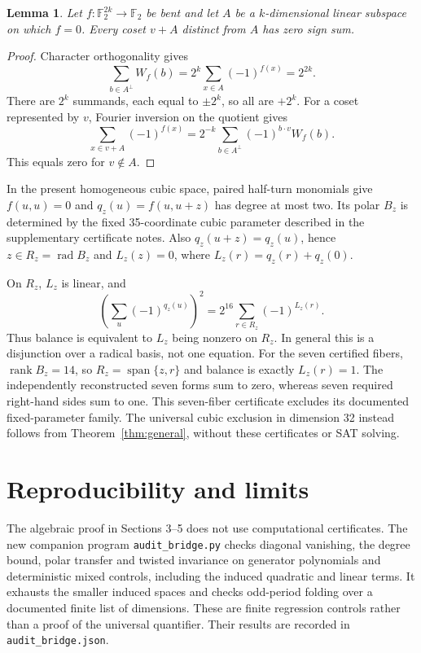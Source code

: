 \documentclass[11pt,a4paper]{article}
\newtheorem{lemma}[theorem]{Lemma}
\newcommand{\F}{\mathbb F_2}
\begin{document}
\begin{lemma}\label{lem:fiber}
Let $f:\F^{2k}\to\F$ be bent and let $A$ be a $k$-dimensional linear subspace on which $f=0$. Every coset $v+A$ distinct from $A$ has zero sign sum.
\end{lemma}
\begin{proof}
Character orthogonality gives
\[
 \sum_{b\in A^\perp}W_f(b)
 =2^k\sum_{x\in A}(-1)^{f(x)}=2^{2k}.
\]
There are $2^k$ summands, each equal to $\pm2^k$, so all are $+2^k$. For a coset represented by $v$, Fourier inversion on the quotient gives
\[
 \sum_{x\in v+A}(-1)^{f(x)}
 =2^{-k}\sum_{b\in A^\perp}(-1)^{b\cdot v}W_f(b).
\]
This equals zero for $v\notin A$.
\end{proof}
In the present homogeneous cubic space, paired half-turn monomials give $f(u,u)=0$ and $q_z(u)=f(u,u+z)$ has degree at most two. Its polar $B_z$ is determined by the fixed 35-coordinate cubic parameter described in the supplementary certificate notes. Also $q_z(u+z)=q_z(u)$, hence $z\in R_z=\operatorname{rad}B_z$ and $L_z(z)=0$, where $L_z(r)=q_z(r)+q_z(0)$.

On $R_z$, $L_z$ is linear, and
\[
 \left(\sum_u(-1)^{q_z(u)}\right)^2
 =2^{16}\sum_{r\in R_z}(-1)^{L_z(r)}.
\]
Thus balance is equivalent to $L_z$ being nonzero on $R_z$. In general this is a disjunction over a radical basis, not one equation. For the seven certified fibers, $\operatorname{rank}B_z=14$, so $R_z=\operatorname{span}\{z,r\}$ and balance is exactly $L_z(r)=1$. The independently reconstructed seven forms sum to zero, whereas seven required right-hand sides sum to one. This seven-fiber certificate excludes its documented fixed-parameter family. The universal cubic exclusion in dimension 32 instead follows from Theorem~\ref{thm:general}, without these certificates or SAT solving.

\section{Reproducibility and limits}
The algebraic proof in Sections 3--5 does not use computational certificates. The new companion program \texttt{audit\_bridge.py} checks diagonal vanishing, the degree bound, polar transfer and twisted invariance on generator polynomials and deterministic mixed controls, including the induced quadratic and linear terms. It exhausts the smaller induced spaces and checks odd-period folding over a documented finite list of dimensions. These are finite regression controls rather than a proof of the universal quantifier. Their results are recorded in \texttt{audit\_bridge.json}.
\end{document}

